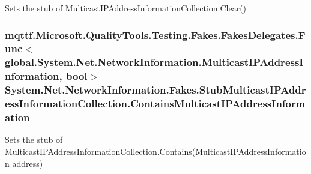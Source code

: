 Sets the stub of Multicast\-I\-P\-Address\-Information\-Collection.\-Clear()

\hypertarget{class_system_1_1_net_1_1_network_information_1_1_fakes_1_1_stub_multicast_i_p_address_information_collection_af6318fc75b7af87b850af01169d6a15d}{
\subsubsection[{Contains\-Multicast\-I\-P\-Address\-Information}]{\setlength{\rightskip}{0pt plus 5cm}mqttf.\-Microsoft.\-Quality\-Tools.\-Testing.\-Fakes.\-Fakes\-Delegates.\-Func$<$global.\-System.\-Net.\-Network\-Information.\-Multicast\-I\-P\-Address\-Information, bool$>$ System.\-Net.\-Network\-Information.\-Fakes.\-Stub\-Multicast\-I\-P\-Address\-Information\-Collection.\-Contains\-Multicast\-I\-P\-Address\-Information}}\label{class_system_1_1_net_1_1_network_information_1_1_fakes_1_1_stub_multicast_i_p_address_information_collection_af6318fc75b7af87b850af01169d6a15d}


Sets the stub of Multicast\-I\-P\-Address\-Information\-Collection.\-Contains(\-Multicast\-I\-P\-Address\-Information address)

